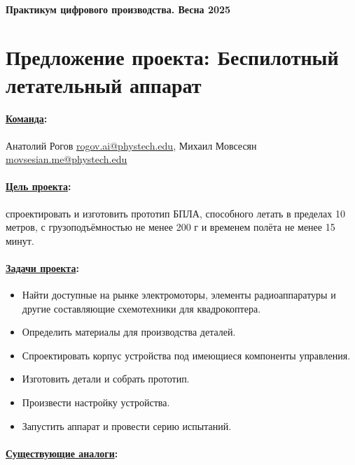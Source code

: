 \documentclass[a4paper,12pt]{article} %
\begin{document}
\paragraph{Практикум цифрового производства. Весна 2025}
\section*{Предложение проекта: \newline Беспилотный летательный аппарат}

\paragraph{\underline{Команда}:}
Анатолий Рогов \href{mailto:rogov.ai@phystech.edu}{\underline{rogov.ai@phystech.edu}}, Михаил Мовсесян \href{mailto:movsesian.me@phystech.edu}{\underline{movsesian.me@phystech.edu}}

\paragraph{\underline{Цель проекта}:}
спроектировать и изготовить прототип БПЛА, способного летать в пределах 10 метров, с грузоподъёмностью не менее 200 г и временем полёта не менее 15 минут.

\paragraph{\underline{Задачи проекта}:}
\begin{itemize}
    \item Найти доступные на рынке электромоторы, элементы радиоаппаратуры и другие составляющие схемотехники для квадрокоптера.
    \item Определить материалы для производства деталей.
    \item Спроектировать корпус устройства под имеющиеся компоненты управления.
    \item Изготовить детали и собрать прототип.
    \item Произвести настройку устройства.
    \item Запустить аппарат и провести серию испытаний.

\end{itemize}

\paragraph{\underline{Существующие аналоги}:}
\end{document}
